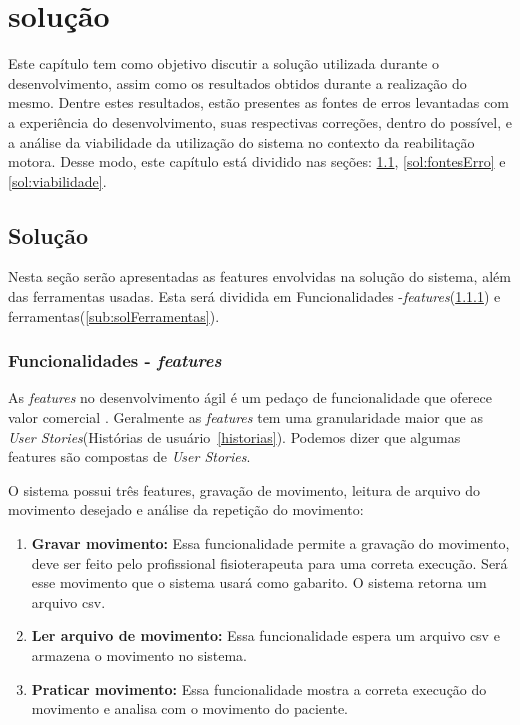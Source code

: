 \chapter[Solução]{solução}
  Este capítulo tem como objetivo discutir a solução utilizada durante o
desenvolvimento, assim como os resultados obtidos durante a realização do mesmo. Dentre estes
resultados, estão presentes as fontes de erros levantadas com a experiência do desenvolvimento,
suas respectivas correções, dentro do possível, e a análise da viabilidade da utilização do
sistema no contexto da reabilitação motora. Desse modo, este
capítulo está dividido nas seções: \ref{sol:solucao}, \ref{sol:fontesErro} e \ref{sol:viabilidade}.

\section{Solução}\label{sol:solucao}
  Nesta seção serão apresentadas as features envolvidas na solução do sistema,
além das ferramentas usadas. Esta será dividida em Funcionalidades -\textit{features}(\ref{sub:solFeatures}) e
ferramentas(\ref{sub:solFerramentas}).

\subsection{Funcionalidades - \textit{features}}\label{sub:solFeatures}
  As \textit{features} no desenvolvimento ágil é um pedaço de funcionalidade que oferece valor comercial \cite{versionOne}.
Geralmente as \textit{features} tem uma granularidade maior que as \textit{User Stories}(Histórias de usuário~\ref{historias}).
Podemos dizer que algumas features são compostas de \textit{User Stories}.

  O sistema possui três features, gravação de movimento, leitura de arquivo do movimento desejado e análise da repetição do movimento:
\begin{enumerate}
  \item \textbf{Gravar movimento:} Essa funcionalidade permite a gravação do movimento, deve ser feito pelo profissional fisioterapeuta
  para uma correta execução. Será esse movimento que o sistema usará como gabarito. O sistema retorna um arquivo csv.
  \item \textbf{Ler arquivo de movimento:} Essa funcionalidade espera um arquivo csv e armazena o movimento no sistema.
  \item \textbf{Praticar movimento:} Essa funcionalidade mostra a correta execução do movimento e analisa com o movimento do paciente.
\end{enumerate}

